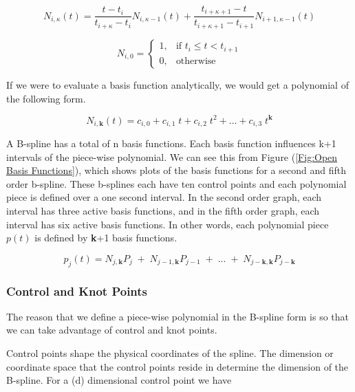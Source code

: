 \documentclass{article}
\begin{document}
  \begin{equation} \label{eq:Basis function equation}
  N_{i,\kappa}(t) = \frac{t - t_i}{t_{i+\kappa} - t_i} N_{i,\kappa-1}(t) + \frac{t_{i+\kappa+1} - t}{t_{i+\kappa+1}-t_{i+1}} N_{i+1 , \kappa-1}(t)    
  \end{equation}
  
    \begin{equation} \label{eq:Basis function equation zeros}
      N_{i,0} =   \begin{cases} 1, &  \text{if } t_i \leq t < t_{i+1} \\
                            0, & \text{otherwise} \end{cases}
  \end{equation}
  
  If we were to evaluate a basis function analytically, we would get a polynomial of the following form.
  
  \begin{equation}
      N_{i,\textbf{k}}(t) = c_{i,0} + c_{i,1} \; t + c_{i,2} \; t^{2} + ... + c_{i,3} \; t^{\textbf{k}}
  \end{equation}
  
  A B-spline has a total of n basis functions. Each basis function influences k+1 intervals of the piece-wise polynomial. We can see this from Figure (\ref{Fig:Open Basis Functions}), which shows plots of the basis functions for a second and fifth order b-spline. These b-splines each have ten control points and each polynomial piece is defined over a one second interval. In the second order graph, each interval has three active basis functions, and in the fifth order graph, each interval has six active basis functions. In other words, each polynomial piece \(p(t)\) is defined by \textbf{k}+1 basis functions. 
  
\begin{equation}
    p_j(t) = N_{j,\textbf{k}} P_{j} \; + \; N_{j-1,\textbf{k}} P_{j-1} \; + \; ... \; + \; N_{j-\textbf{k},\textbf{k}} P_{j-\textbf{k}}
\end{equation}

\subsubsection{Control and Knot Points} \label{Control and Knot Points}
The reason that we define a piece-wise polynomial in the B-spline form is so that we can take advantage of control and knot points. 

Control points shape the physical coordinates of the spline. The dimension or coordinate space that the control points reside in determine the dimension of the B-spline. For a (d) dimensional control point we have
 
\end{document}
